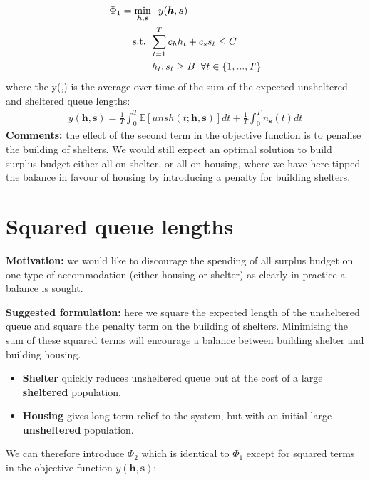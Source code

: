 \documentclass{article}
\begin{document}
\begin{align*}
        & \Phi_1 = \min_{\boldsymbol{h},\boldsymbol{s}} \hspace{0.2cm} y(\boldsymbol{h},\boldsymbol{s}) \\
        & \hspace{0.7cm} \text{ s.t. } \sum_{t=1}^{T} c_{h}h_{t} + c_{s}s_{t} \leq C \\
        & \hspace{1.5cm} h_t, s_t \geq B \hspace{0.2cm} \forall t \in \{1, ..., T\}
\end{align*}
%
where the y(,) is the average over time of the sum of the expected unsheltered and sheltered queue lengths: 
\begin{align*}
  y(\boldsymbol{h},\boldsymbol{s}) = \frac{1}{T} \int_0^T \mathbb{E}[unsh(t; \boldsymbol{h},\boldsymbol{s})] dt + \frac{1}{T} \int_0^T n_{\boldsymbol{s}}(t) dt
\end{align*}
%
\textbf{Comments:} the effect of the second term in the objective function is to penalise the building of shelters. We would still expect an optimal solution to build surplus budget either all on shelter, or all on housing, where we have here tipped the balance in favour of housing by introducing a penalty for building shelters. 

\newpage

\section{Squared queue lengths}

\textbf{Motivation:} we would like to discourage the spending of all surplus budget on one type of accommodation (either housing or shelter) as clearly in practice a balance is sought. \par
%
\textbf{Suggested formulation:} here we square the expected length of the unsheltered queue and square the penalty term on the building of shelters. Minimising the sum of these squared terms will encourage a balance between building shelter and building housing.
%
\begin{itemize}[noitemsep]
\item \textbf{Shelter} quickly reduces unsheltered queue but at the cost of a large \textbf{sheltered} population.
\item \textbf{Housing} gives long-term relief to the system, but with an initial large \textbf{unsheltered} population. 
\end{itemize}
%
We can therefore introduce $\Phi_2$ which is identical to $\Phi_1$ except for squared terms in the objective function $y(\boldsymbol{h},\boldsymbol{s})$: 
\end{document}
